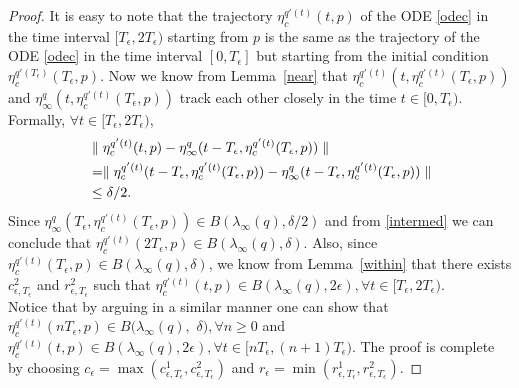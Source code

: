 \begin{proof}
It is easy to note that the trajectory $\eta^{q'(t)}_c(t,p)$ of the ODE \eqref{odec} in the time interval 
$[T_\epsilon,2T_\epsilon)$ starting from $p$ is the same as the trajectory of the ODE \eqref{odec} in the 
time interval $[0,T_\epsilon]$ but starting from the initial condition 
$\eta^{q'(T_\epsilon)}_c(T_\epsilon,p)$. Now we know from Lemma~\ref{near} that 
$\eta^{q'(t)}_c(t,\eta^{q'(t)}_c(T_\epsilon,p))$ and $\eta^{q}_\infty(t,\eta^{q'(t)}_c(T_\epsilon,p))$ 
track each other closely in the time $t\in [0,T_\epsilon)$.
Formally, $\forall t\in [T_\epsilon,2T_\epsilon)$,
\begin{align}\label{intermed}
&\parallel \eta^{q'(t)}_c(t, p)-\eta^q_\infty(t-T_\epsilon,\eta^{q'(t)}_c(T_\epsilon,p))\parallel
\nonumber\\&=\parallel \eta^{q'(t)}_c(t-T_\epsilon,\eta^{q'(t)}_c(T_\epsilon,p))-\eta^q_\infty(t-T_\epsilon,\eta^{q'(t)}_c(T_\epsilon,p))\parallel \nonumber\\&\leq \delta/2.
\end{align}
Since $\eta^q_\infty(T_\epsilon, \eta^{q'(t)}_c(T_\epsilon,p)) \in B(\lambda_\infty(q),\delta/2)$ and from \eqref{intermed} we can conclude that $\eta^{q'(t)}_c(2T_\epsilon,p) \in B(\lambda_\infty(q),\delta)$. Also, since $\eta^{q'(t)}_c(T_\epsilon,p) \in B(\lambda_\infty(q),\delta)$, we know from Lemma~\ref{within} that there exists $c^2_{\epsilon,T_\epsilon}$ and $r^2_{\epsilon,T_\epsilon}$ such that $\eta^{q'(t)}_c(t,p) \in B(\lambda_\infty(q),2\epsilon), \forall t\in [T_\epsilon,2T_\epsilon)$.\\
Notice that by arguing in a similar manner one can show that $\eta^{q'(t)}_c(nT_\epsilon,p)\in B(\lambda_\infty(q),$ $\delta), \forall n\geq 0$ and $\eta^{q'(t)}_c(t,p) \in B(\lambda_\infty(q),2\epsilon), \forall t\in [nT_\epsilon,(n+1)T_\epsilon)$. The proof is complete by choosing $c_\epsilon=\max(c^1_{\epsilon,T_\epsilon},c^2_{\epsilon,T_\epsilon})$ and $r_\epsilon=\min(r^1_{\epsilon,T_\epsilon},r^2_{\epsilon,T_\epsilon})$.
\end{proof}
